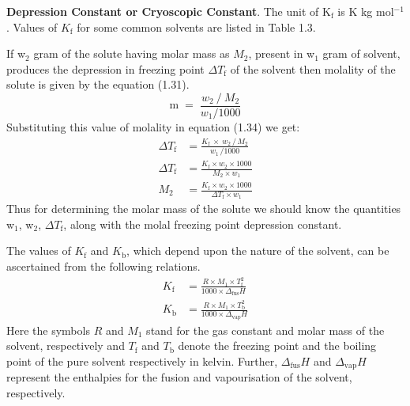\documentclass[11pt,a4paper]{article}
\begin{document}
\noindent\hfill\begin{minipage}[t]{0.765\textwidth}
\textbf{Depression Constant or Cryoscopic Constant}. The unit of K$_\text{f}$ is K kg mol$^{-1}$. Values of $K_\text{f}$ for some common solvents are listed in Table 1.3.

\hspace*{1.5em}If w$_2$ gram of the solute having molar mass as $M_2$, present in w$_1$ gram of solvent, produces the depression in freezing point $\Delta T_\text{f}$ of the solvent then molality of the solute is given by the equation (1.31).
\[ \text{m} \;=\; \frac{w_2\ /\ M_2}{w_1/1000} \tag{1.31} \]
\hspace*{1.5em}Substituting this value of molality in equation (1.34) we get:
\begin{align*}
\Delta T_\text{f} &= \frac{K_\text{f}\ \times\ w_2\,/\,M_2}{w_1\,/1000}\\
\Delta T_\text{f} &= \frac{K_\text{f} \times w_2 \times 1000}{M_2 \times w_1} \tag{1.35}\\
M_2 &= \frac{K_\text{f} \times w_2 \times 1000}{\Delta T_\text{f} \times w_1} \tag{1.36}
\end{align*}
\hspace*{1.5em}Thus for determining the molar mass of the solute we should know the quantities w$_1$, w$_2$, $\Delta T_\text{f}$, along with the molal freezing point depression constant.

\hspace*{1.5em}The values of $K_\text{f}$ and $K_\text{b}$, which depend upon the nature of the solvent, can be ascertained from the following relations.
\begin{align*}
K_\text{f} &= \frac{R \times M_1 \times T_\text{f}^2}{1000 \times \Delta_{\text{fus}}H} \tag{1.37}\\
K_\text{b} &= \frac{R \times M_1 \times T_\text{b}^2}{1000 \times \Delta_{\text{vap}}H} \tag{1.38}
\end{align*}
\hspace*{1.5em}Here the symbols $R$ and $M_1$ stand for the gas constant and molar mass of the solvent, respectively and $T_\text{f}$ and $T_\text{b}$ denote the freezing point and the boiling point of the pure solvent respectively in kelvin. Further, $\Delta_{\text{fus}}H$ and $\Delta_{\text{vap}}H$ represent the enthalpies for the fusion and vapourisation of the solvent, respectively.
\end{minipage}
\end{document}
